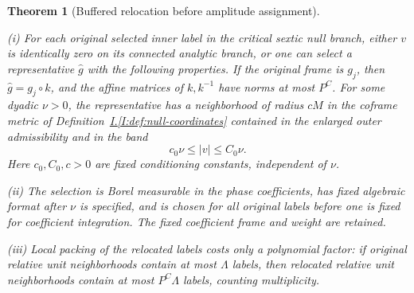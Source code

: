 \documentclass[11pt]{amsart}
\newtheorem{theorem}{Theorem}[section]
\theoremstyle{definition}
\theoremstyle{remark}
\numberwithin{equation}{section}
\newcommand{\partIref}[1]{\hyperref[I:#1]{I.\ref*{I:#1}}}
\begin{document}
\begin{theorem}[Buffered relocation before amplitude assignment]\label{low:6:r1:relocation}

\noindent\textup{(i)} For each original selected inner label in the critical sextic null branch, either $v$ is identically zero on its connected analytic branch, or one can select a representative $\widehat g$ with the following properties. If the original frame is $g_j$, then $\widehat g=g_j\circ k$, and the affine matrices of $k,k^{-1}$ have norms at most $P^C$. For some dyadic $\nu>0$, the representative has a neighborhood of radius $cM$ in the coframe metric of Definition~\partIref{def:null-coordinates} contained in the enlarged outer admissibility and in the band
\[
c_0\nu\le |v|\le C_0\nu.
\]
Here $c_0,C_0,c>0$ are fixed conditioning constants, independent of $\nu$.

\noindent\textup{(ii)} The selection is Borel measurable in the phase coefficients, has fixed algebraic format after $\nu$ is specified, and is chosen for all original labels before one is fixed for coefficient integration. The fixed coefficient frame and weight are retained.

\noindent\textup{(iii)} Local packing of the relocated labels costs only a polynomial factor: if original relative unit neighborhoods contain at most $\Lambda$ labels, then relocated relative unit neighborhoods contain at most $P^C\Lambda$ labels, counting multiplicity.
\end{theorem}
\end{document}
